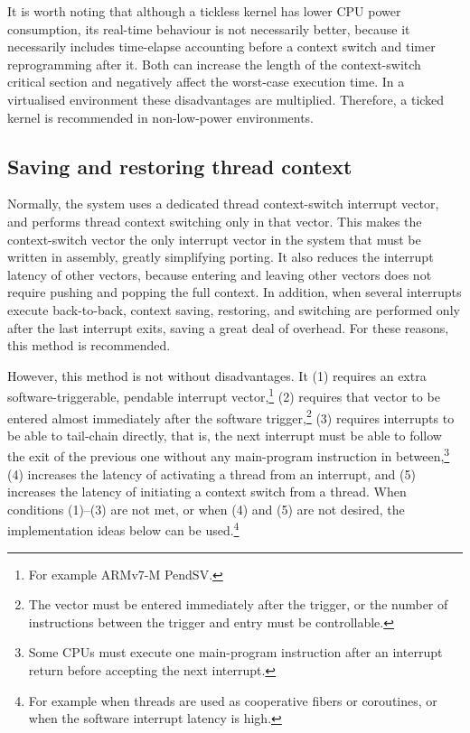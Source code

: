 It is worth noting that although a tickless kernel has lower CPU power consumption, its real-time behaviour is not necessarily better, because it necessarily includes time-elapse accounting before a context switch and timer reprogramming after it.
Both can increase the length of the context-switch critical section and negatively affect the worst-case execution time.
In a virtualised environment these disadvantages are multiplied.
Therefore, a ticked kernel is recommended in non-low-power environments.

\subsection{Saving and restoring thread context}\label{sec:ctx-strategies}

Normally, the system uses a dedicated thread context-switch interrupt vector, and performs thread context switching only in that vector.
This makes the context-switch vector the only interrupt vector in the system that must be written in assembly, greatly simplifying porting.
It also reduces the interrupt latency of other vectors, because entering and leaving other vectors does not require pushing and popping the full context.
In addition, when several interrupts execute back-to-back, context saving, restoring, and switching are performed only after the last interrupt exits, saving a great deal of overhead.
For these reasons, this method is recommended.

However, this method is not without disadvantages.
It (1) requires an extra software-triggerable, pendable interrupt vector,\footnote{For example ARMv7-M PendSV.} (2) requires that vector to be entered almost immediately after the software trigger,\footnote{The vector must be entered immediately after the trigger, or the number of instructions between the trigger and entry must be controllable.} (3) requires interrupts to be able to tail-chain directly, that is, the next interrupt must be able to follow the exit of the previous one without any main-program instruction in between,\footnote{Some CPUs must execute one main-program instruction after an interrupt return before accepting the next interrupt.} (4) increases the latency of activating a thread from an interrupt, and (5) increases the latency of initiating a context switch from a thread.
When conditions (1)--(3) are not met, or when (4) and (5) are not desired, the implementation ideas below can be used.\footnote{For example when threads are used as cooperative fibers or coroutines, or when the software interrupt latency is high.}

